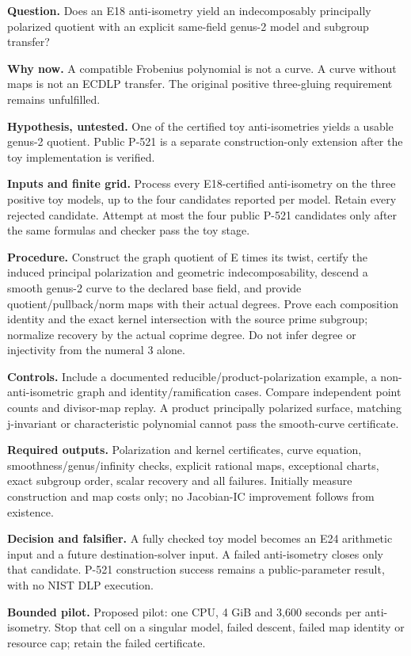\documentclass[
  10pt,
]{article}
\begin{document}
\textbf{Question.} Does an E18 anti-isometry yield an indecomposably
principally polarized quotient with an explicit same-field genus-2 model
and subgroup transfer?

\textbf{Why now.} A compatible Frobenius polynomial is not a curve. A
curve without maps is not an ECDLP transfer. The original positive
three-gluing requirement remains unfulfilled.

\textbf{Hypothesis, untested.} One of the certified toy anti-isometries
yields a usable genus-2 quotient. Public P-521 is a separate
construction-only extension after the toy implementation is verified.

\textbf{Inputs and finite grid.} Process every E18-certified
anti-isometry on the three positive toy models, up to the four
candidates reported per model. Retain every rejected candidate. Attempt
at most the four public P-521 candidates only after the same formulas
and checker pass the toy stage.

\textbf{Procedure.} Construct the graph quotient of E times its twist,
certify the induced principal polarization and geometric
indecomposability, descend a smooth genus-2 curve to the declared base
field, and provide quotient/pullback/norm maps with their actual
degrees. Prove each composition identity and the exact kernel
intersection with the source prime subgroup; normalize recovery by the
actual coprime degree. Do not infer degree or injectivity from the
numeral 3 alone.

\textbf{Controls.} Include a documented reducible/product-polarization
example, a non-anti-isometric graph and identity/ramification cases.
Compare independent point counts and divisor-map replay. A product
principally polarized surface, matching j-invariant or characteristic
polynomial cannot pass the smooth-curve certificate.

\textbf{Required outputs.} Polarization and kernel certificates, curve
equation, smoothness/genus/infinity checks, explicit rational maps,
exceptional charts, exact subgroup order, scalar recovery and all
failures. Initially measure construction and map costs only; no
Jacobian-IC improvement follows from existence.

\textbf{Decision and falsifier.} A fully checked toy model becomes an
E24 arithmetic input and a future destination-solver input. A failed
anti-isometry closes only that candidate. P-521 construction success
remains a public-parameter result, with no NIST DLP execution.

\textbf{Bounded pilot.} Proposed pilot: one CPU, 4 GiB and 3,600 seconds
per anti-isometry. Stop that cell on a singular model, failed descent,
failed map identity or resource cap; retain the failed certificate.
\end{document}
